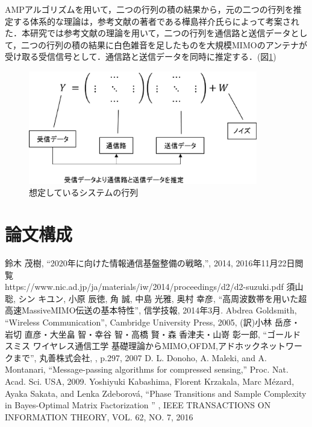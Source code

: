 \documentclass[report]{jsbook}
\begin{document}
AMPアルゴリズムを用いて，二つの行列の積の結果から，元の二つの行列を推定する体系的な理論は，参考文献\cite{kabashima}の著者である樺島祥介氏らによって考案された．本研究では参考文献\cite{kabashima}の理論を用いて，二つの行列を通信路と送信データとして，二つの行列の積の結果に白色雑音を足したものを大規模MIMOのアンテナが受け取る受信信号として．通信路と送信データを同時に推定する．(図\ref{fig:matrix})
\begin{figure}[htbp]
  \begin{center}
    \includegraphics[clip,width=10.0cm]{./matrix.eps}
    \caption{想定しているシステムの行列}
    \label{fig:matrix}
  \end{center}
\end{figure}


\section{論文構成}

\newpage
  \begin{thebibliography}{10}
    鈴木 茂樹, ``2020年に向けた情報通信基盤整備の戦略,'', 2014, 2016年11月22日閲覧 \\ {https://www.nic.ad.jp/ja/materials/iw/2014/proceedings/d2/d2-suzuki.pdf}
    須山 聡, シン キユン, 小原 辰徳, 角 誠, 中島 光雅, 奥村 幸彦, ``高周波数帯を用いた超高速MassiveMIMO伝送の基本特性'', 信学技報, 2014年3月.
    Abdrea Goldsmith, ``Wireless Communication'', Cambridge University Press, 2005, (訳)小林 岳彦・ 岩切 直彦・大坐畠 智・幸谷 智・高橋 賢・森 香津夫・山嵜 彰一郎, ``ゴールドスミス ワイヤレス通信工学 基礎理論からMIMO,OFDM,アドホックネットワークまで'', 丸善株式会社, , p.297, 2007
    D. L. Donoho, A. Maleki, and A. Montanari, “Message-passing algorithms for compressed sensing,” Proc. Nat. Acad. Sci. USA, 2009. 
    Yoshiyuki Kabashima, Florent Krzakala, Marc Mézard, Ayaka Sakata, and Lenka Zdeborová, ``Phase Transitions and Sample Complexity in Bayes-Optimal Matrix Factorization '' , IEEE TRANSACTIONS ON INFORMATION THEORY, VOL. 62, NO. 7, 2016

  \end{thebibliography}
\end{document}
